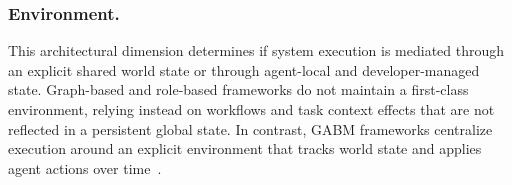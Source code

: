 







\vspace{-1mm}
\subsubsection{Environment.}
This architectural dimension determines if system execution is mediated through an explicit shared world state or through agent-local and developer-managed state. Graph-based and role-based frameworks do not maintain a first-class environment, relying instead on workflows and task context effects that are not reflected in a persistent global state. In contrast, GABM frameworks centralize execution around an explicit environment that tracks world state and applies agent actions over time~\cite{vezhnevets2023generative}. 